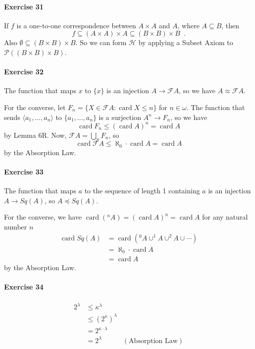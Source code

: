 \documentclass{report}
\newcommand{\card}{\ensuremath{\operatorname{card}}}
\begin{document}
    \paragraph{Exercise 31}
    If $f$ is a one-to-one correspondence between $A \times A$ and $A$, where $A \subseteq B$,
    then
    \[ f \subseteq (A \times A) \times A \subseteq (B \times B) \times B \enspace . \]
    Also $\emptyset \subseteq (B \times B) \times B$. So we can form $\mathcal{H}$ by applying a Subset
    Axiom to $\mathcal{P} ((B \times B) \times B)$.

    \paragraph{Exercise 32}
    The function that maps $x$ to $\{x\}$ is an injection $A \rightarrow \mathcal{F} A$, so we have
    $A \approx \mathcal{F} A$.

    For the converse, let $F_n = \{ X \in \mathcal{F} A : \card X \leq n \}$ for $n \in \omega$. The function
    that sends $\langle a_1, \ldots, a_n \rangle$ to $\{ a_1, \ldots, a_n \}$ is a surjection $A^n \rightarrow
    F_n$, so we have
    \[ \card F_n \leq (\card A)^n = \card A \]
    by Lemma 6R. Now, $\mathcal{F} A = \bigcup_n F_n$, so
    \[ \card \mathcal{F} A \leq \aleph_0 \cdot \card A = \card A \]
    by the Absorption Law.

    \paragraph{Exercise 33}
    The function that maps $a$ to the sequence of length 1 containing $a$ is an injection $A \rightarrow Sq(A)$,
    so $A \preccurlyeq Sq(A)$.

    For the converse, we have $\card (^n A) = (\card A)^n = \card A$ for any natural number $n$
    \begin{align*}
        \card Sq(A) & = \card (^0 A \cup ^1 A \cup ^2 A \cup \cdots) \\
        & = \aleph_0 \cdot \card A \\
        & = \card A
    \end{align*}
    by the Absorption Law.

    \paragraph{Exercise 34}
    \begin{align*}
        2^\lambda & \leq \kappa^\lambda \\
        & \leq (2^\kappa)^\lambda \\
        & = 2^{\kappa \cdot \lambda} \\
        & = 2^\lambda & (\text{Absorption Law})
    \end{align*}
\end{document}
